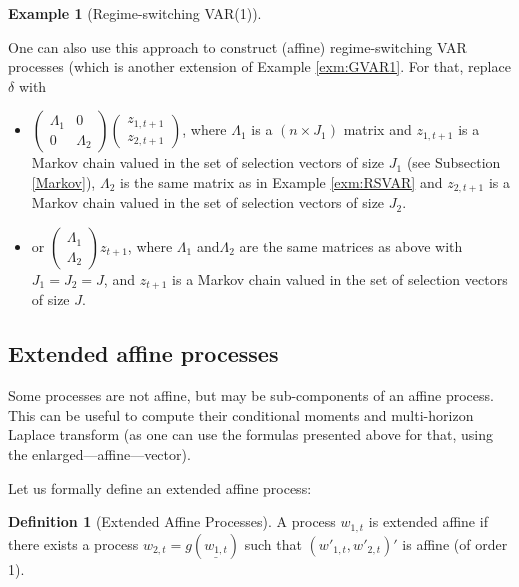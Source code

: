 \documentclass[
  12pt,
]{book}
\providecommand{\tightlist}{%
  \setlength{\itemsep}{0pt}\setlength{\parskip}{0pt}}
\theoremstyle{definition}
\newtheorem{definition}{Definition}[chapter]
\theoremstyle{definition}
\newtheorem{example}{Example}[chapter]
\theoremstyle{definition}
\theoremstyle{definition}
\theoremstyle{remark}
\begin{document}
\begin{example}[Regime-switching VAR(1)]
\protect\hypertarget{exm:RSVAR2}{}\label{exm:RSVAR2}

One can also use this approach to construct (affine) regime-switching VAR processes (which is another extension of Example \ref{exm:GVAR1}. For that, replace \(\delta\) with

\begin{itemize}
\tightlist
\item
  \(\left( \begin{array}{ll} \Lambda_1 & 0 \\ 0 & \Lambda_2 \end{array} \right)\)\(\left( \begin{array}{l} z_{1,t+1} \\ z_{2,t+1} \end{array} \right)\), where \(\Lambda_1\) is a \((n \times J_1)\) matrix and \(z_{1,t+1}\) is a Markov chain valued in the set of selection vectors of size \(J_1\) (see Subsection \ref{Markov}), \(\Lambda_2\) is the same matrix as in Example \ref{exm:RSVAR} and \(z_{2,t+1}\) is a Markov chain valued in the set of selection vectors of size \(J_2\).
\item
  or \(\left( \begin{array}{l} \Lambda_1 \\ \Lambda_2 \end{array}\right)z_{t+1}\), where \(\Lambda_1\) and\(\Lambda_2\) are the same matrices as above with \(J_1=J_2=J\), and \(z_{t+1}\) is a Markov chain valued in the set of selection vectors of size \(J\).
\end{itemize}

\end{example}

\hypertarget{AffineExtended}{%
\subsection{Extended affine processes}\label{AffineExtended}}

Some processes are not affine, but may be sub-components of an affine process. This can be useful to compute their conditional moments and multi-horizon Laplace transform (as one can use the formulas presented above for that, using the enlarged---affine---vector).

Let us formally define an extended affine process:

\begin{definition}[Extended Affine Processes]
\protect\hypertarget{def:ExtAffine}{}\label{def:ExtAffine}A process \(w_{1,t}\) is extended affine if there exists a process \(w_{2,t} = g(\underline{w_{1,t}})\) such that \((w'_{1,t}, w'_{2,t})'\) is affine (of order 1).
\end{definition}
\end{document}
